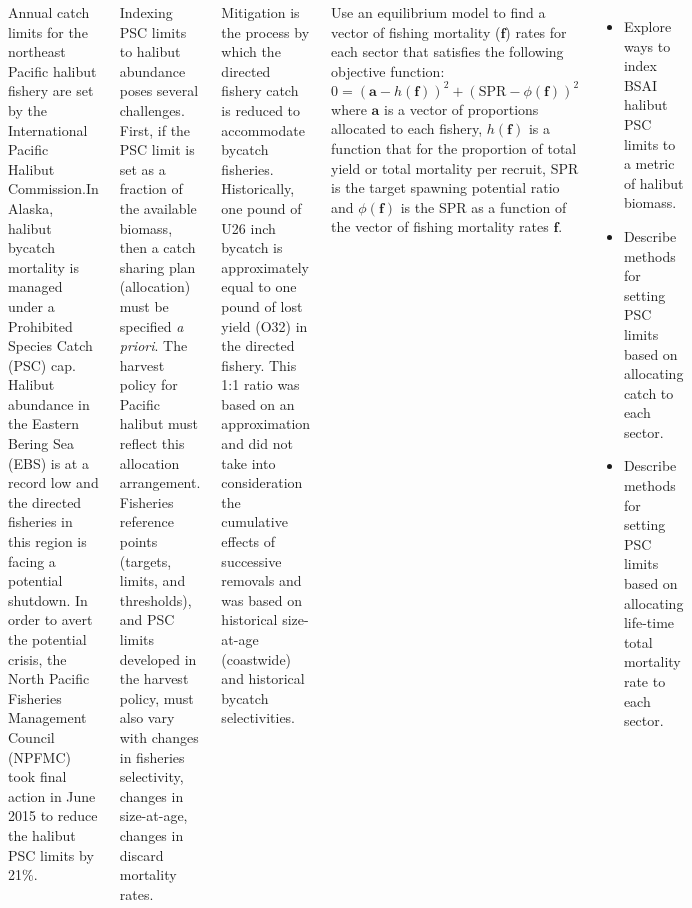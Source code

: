 \documentclass[20pt, a0paper, landscape]{tikzposter}
\begin{document}
\begin{columns}
	{

		Annual catch limits for the northeast Pacific halibut fishery are set by the International Pacific Halibut Commission.In Alaska, halibut bycatch mortality is managed under a Prohibited Species Catch (PSC) cap.  Halibut abundance in the Eastern Bering Sea (EBS) is at a record low and the directed fisheries in this region is facing a potential shutdown.  In order to avert the potential crisis, the North Pacific Fisheries Management Council (NPFMC) took final action in June 2015 to reduce the halibut PSC limits by 21\%. 

		Indexing PSC limits to halibut abundance poses several challenges.  First, if the PSC limit is set as a fraction of the available biomass, then a catch sharing plan (allocation) must be specified \emph{a priori}.  The harvest policy for Pacific halibut must reflect this allocation arrangement.  Fisheries reference points (targets, limits, and thresholds), and PSC limits developed in the harvest policy, must also vary with changes in fisheries selectivity, changes in size-at-age, changes in discard mortality rates.

		Mitigation is the process by which the directed fishery catch is reduced to accommodate bycatch fisheries.  Historically, one pound of U26 inch bycatch is approximately equal to one pound of lost yield (O32) in the directed fishery.  This 1:1 ratio was based on an approximation and did not take into consideration the cumulative effects of successive removals and was based on historical size-at-age (coastwide) and historical bycatch selectivities.
	}

	{
		Use an equilibrium model to find a vector of fishing mortality ($\bm{f}$) rates for each sector that satisfies the following objective function:
		\[
			0 = \left(\bm{a}-h(\bm{f})\right)^2 
						+ \left(\mbox{SPR} - \phi(\bm{f})\right)^2
		\]
		where $\bm{a}$ is a vector of proportions allocated to each fishery, $h(\bm{f})$ is a function that for the proportion of total yield or total mortality per recruit, SPR is the target spawning potential ratio and $\phi(\bm{f})$ is the SPR as a function of the vector of fishing mortality rates $\bm{f}$.
	}
	{
		
		\begin{itemize}
			\item Explore ways to index BSAI halibut PSC limits to a metric of halibut biomass.
			\item Describe methods for setting PSC limits based on allocating catch to each sector.
			\item Describe methods for setting PSC limits based on allocating life-time total mortality rate to each sector.
		\end{itemize}
		 
}
\end{columns}
\end{document}
